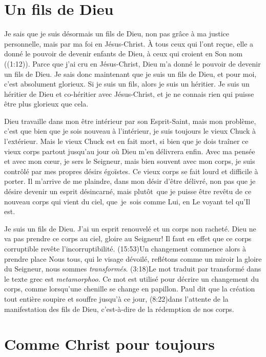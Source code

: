 \section{Un fils de Dieu}

Je sais que je suis désormais un fils de Dieu,
 non pas grâce à ma justice personnelle,
 mais par ma foi en Jésus-Christ.
 \Og À tous ceux qui l'ont reçue, elle a donné le pouvoir
 de devenir enfants de Dieu,
 à ceux qui croient en Son nom \Fg{} ((1:12)).
 Parce que j'ai cru en Jésus-Christ, Dieu m'a donné le pouvoir
 de devenir un fils de Dieu.
 Je sais donc maintenant que je suis un fils de Dieu,
 et pour moi, c'est absolument glorieux.
 Si je suis un fils, alors je suis un héritier.
 Je suis un héritier de Dieu et co-héritier avec Jésus-Christ,
 et je ne connais rien qui puisse être plus glorieux que cela.

Dieu travaille dans mon être intérieur par son Esprit-Saint,
 mais mon problème, c'est que bien que je sois nouveau à l'intérieur,
 je suis toujours le vieux Chuck à l'extérieur.
 Mais le vieux Chuck est en fait mort, si bien que je dois traîner
 ce vieux corps partout jusqu'au jour où Dieu m'en délivrera enfin.
 Avec ma pensée et avec mon cœur, je sers le Seigneur,
 mais bien souvent avec mon corps,
 je suis contrôlé par mes propres désirs égoïstes.
 Ce vieux corps se fait lourd et difficile à porter.
 Il m'arrive de me plaindre, dans mon désir d'être délivré,
 non pas que je désire devenir un esprit désincarné,
 mais plutôt~que je puisse
 être revêtu de ce nouveau corps qui vient du ciel,
 que~je~sois comme Lui, en Le voyant tel qu'Il est.

Je suis un fils de Dieu. J'ai un esprit renouvelé et un corps non racheté.
 Dieu ne va pas prendre ce corps au ciel, gloire au Seigneur!
 \Og Il faut en effet que ce corps corruptible
 revête l'incorruptibilité. \Fg{}
 (15:53)Un changement
 commence alors à prendre place\frcolon{}
 \Og Nous tous, qui le visage dévoilé,
 reflétons comme un miroir la gloire du Seigneur,
 nous sommes \emph{transformés}. \Fg{}
 (3:18)Le mot traduit
 par \Og transformé \Fg{}
 dans le texte grec est \emph{metamorphoo}.
 Ce mot est utilisé pour décrire un changement du corps,
 comme lorsqu'une chenille se change en papillon.
 Paul dit que la création tout entière soupire et souffre
 jusqu'à ce jour, (8:22)dans l'attente
 de la manifestation des fils de Dieu,
 c'est-à-dire de la rédemption de nos corps.


\section{Comme Christ pour toujours}

